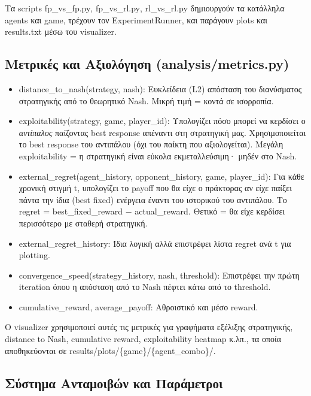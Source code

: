 \documentclass[11pt,a4paper]{article}
\newcommand{\eng}[1]{\foreignlanguage{english}{#1}}
\begin{document}
Τα scripts \eng{fp\_vs\_fp.py}, \eng{fp\_vs\_rl.py}, \eng{rl\_vs\_rl.py} δημιουργούν τα κατάλληλα agents και game, τρέχουν τον ExperimentRunner, και παράγουν plots και results.txt μέσω του visualizer.

\subsection{Μετρικές και Αξιολόγηση (\eng{analysis/metrics.py})}

\begin{itemize}
\item \eng{distance\_to\_nash(strategy, nash)}: Ευκλείδεια (L2) απόσταση του διανύσματος στρατηγικής από το θεωρητικό Nash. Μικρή τιμή = κοντά σε ισορροπία.

\item \eng{exploitability(strategy, game, player\_id)}: Υπολογίζει πόσο μπορεί να κερδίσει ο \emph{αντίπαλος} παίζοντας best response απέναντι στη στρατηγική μας. Χρησιμοποιείται το best response του αντιπάλου (όχι του παίκτη που αξιολογείται). Μεγάλη exploitability = η στρατηγική είναι εύκολα εκμεταλλεύσιμη· μηδέν στο Nash.

\item \eng{external\_regret(agent\_history, opponent\_history, game, player\_id)}: Για κάθε χρονική στιγμή t, υπολογίζει το payoff που θα είχε ο πράκτορας αν είχε παίξει πάντα την ίδια (best fixed) ενέργεια έναντι του ιστορικού του αντιπάλου. Το regret = best\_fixed\_reward − actual\_reward. Θετικό = θα είχε κερδίσει περισσότερο με σταθερή στρατηγική.

\item \eng{external\_regret\_history}: Ίδια λογική αλλά επιστρέφει λίστα regret ανά t για plotting.

\item \eng{convergence\_speed(strategy\_history, nash, threshold)}: Επιστρέφει την πρώτη iteration όπου η απόσταση από το Nash πέφτει κάτω από το threshold.

\item \eng{cumulative\_reward}, \eng{average\_payoff}: Αθροιστικό και μέσο reward.
\end{itemize}

Ο visualizer χρησιμοποιεί αυτές τις μετρικές για γραφήματα εξέλιξης στρατηγικής, distance to Nash, cumulative reward, exploitability heatmap κ.λπ., τα οποία αποθηκεύονται σε \eng{results/plots/\{game\}/\{agent\_combo\}/}.

\subsection{Σύστημα Ανταμοιβών και Παράμετροι}
\end{document}
